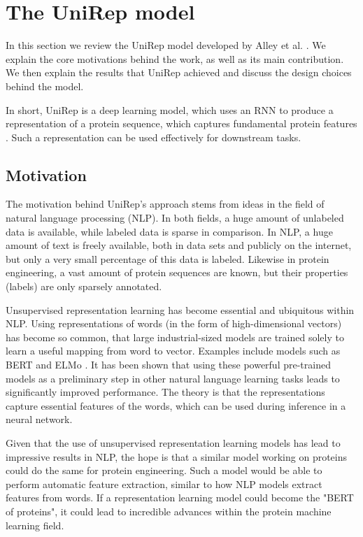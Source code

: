 \documentclass[a4paper,12pt]{article}
\begin{document}
\clearpage
\section{The UniRep model}
In this section we review the UniRep model developed by Alley et al. \cite{alley2019unified}. We explain the core motivations behind the work, as well as its main contribution. We then explain the results that UniRep achieved and discuss the design choices behind the model.

In short, UniRep is a deep learning model, which uses an RNN to produce a representation of a protein sequence, which captures fundamental protein features \cite{alley2019unified}. Such a representation can be used effectively for downstream tasks.

\subsection{Motivation}
The motivation behind UniRep's approach stems from ideas in the field of natural language processing (NLP). In both fields, a huge amount of unlabeled data is available, while labeled data is sparse in comparison. In NLP, a huge amount of text is freely available, both in data sets and publicly on the internet, but only a very small percentage of this data is labeled. Likewise in protein engineering, a vast amount of protein sequences are known, but their properties (labels) are only sparsely annotated.

Unsupervised representation learning has become essential and ubiquitous within NLP. Using representations of words (in the form of high-dimensional vectors) has become so common, that large industrial-sized models are trained solely to learn a useful mapping from word to vector. Examples include models such as BERT \cite{devlin2018bert} and ELMo \cite{peters2018deep}. It has been shown that using these powerful pre-trained models as a preliminary step in other natural language learning tasks leads to significantly improved performance. The theory is that the representations capture essential features of the words, which can be used during inference in a neural network.

Given that the use of unsupervised representation learning models has lead to impressive results in NLP, the hope is that a similar model working on proteins could do the same for protein engineering. Such a model would be able to perform automatic feature extraction, similar to how NLP models extract features from words. If a representation learning model could become the "BERT of proteins", it could lead to incredible advances within the protein machine learning field.
\end{document}
